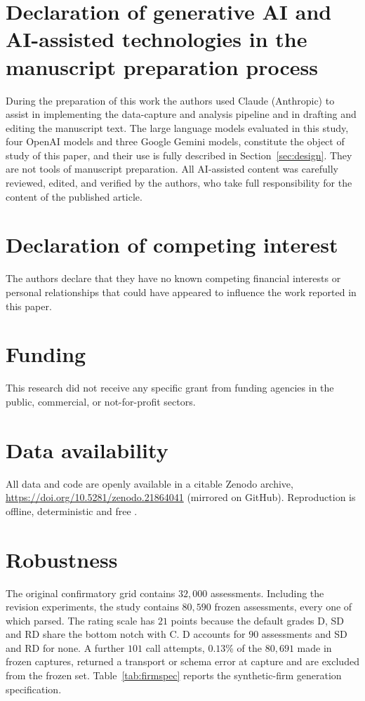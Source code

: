\documentclass[a4paper,fleqn]{cas-sc}
\begin{document}
\section*{Declaration of generative AI and AI-assisted technologies in the manuscript preparation process}
During the preparation of this work the authors used Claude (Anthropic) to assist in implementing the
data-capture and analysis pipeline and in drafting and editing the manuscript text. The large language
models evaluated in this study, four OpenAI models and three Google Gemini models, constitute the
object of study of this paper, and their use is fully described in Section~\ref{sec:design}. They are
not tools of manuscript preparation. All AI-assisted content was carefully reviewed, edited, and
verified by the authors, who take full responsibility for the content of the published article.

\section*{Declaration of competing interest}
The authors declare that they have no known competing financial interests or personal relationships
that could have appeared to influence the work reported in this paper.

\section*{Funding}
This research did not receive any specific grant from funding agencies in the public, commercial, or
not-for-profit sectors.

\section*{Data availability}
All data and code are openly available in a citable Zenodo archive,
\url{https://doi.org/10.5281/zenodo.21864041} (mirrored on GitHub). Reproduction is offline,
deterministic and free \citep{artifact2026}.

\appendix
\section{Robustness}\label{app:robust}
The original confirmatory grid contains $32{,}000$ assessments. Including the revision experiments,
the study contains $80{,}590$ frozen assessments, every one of which parsed. The rating scale has $21$ points because the default grades D, SD and RD share the bottom notch with C. D accounts for $90$ assessments and SD and RD for none. A further $101$ call attempts, $0.13$\% of the $80{,}691$ made in frozen captures, returned a transport or schema error at capture and are excluded from the frozen set. Table~\ref{tab:firmspec}
reports the synthetic-firm generation specification.
\end{document}
